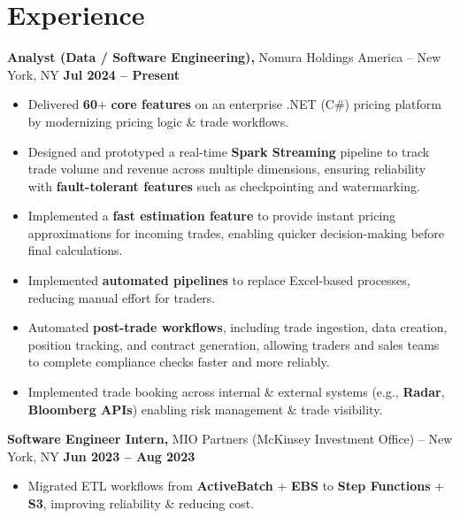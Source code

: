 \documentclass[letterpaper]{article}
\begin{document}
\section*{Experience}
\textbf{Analyst (Data / Software Engineering),} Nomura Holdings America -- New York, NY \hfill \textbf{Jul 2024 -- Present} \\
\vspace{2pt}
\begin{itemize}
  \item Delivered \textbf{60}+ \textbf{core features} on an enterprise .NET (C\#) pricing platform by modernizing pricing logic \& trade workflows.
  \item Designed and prototyped a real-time \textbf{Spark Streaming} pipeline to track trade volume and revenue across multiple dimensions, ensuring reliability with \textbf{fault-tolerant features} such as checkpointing and watermarking.
  \item Implemented a \textbf{fast estimation feature} to provide instant pricing approximations for incoming trades, enabling quicker decision-making before final calculations.
  \item Implemented \textbf{automated pipelines} to replace Excel-based processes, reducing manual effort for traders.
  \item Automated \textbf{post-trade workflows}, including trade ingestion, data creation, position tracking, and contract generation, allowing traders and sales teams to complete compliance checks faster and more reliably.
  \item Implemented trade booking across internal \& external systems (e.g., \textbf{Radar}, \textbf{Bloomberg APIs}) enabling risk management \& trade visibility.
\end{itemize}

\textbf{Software Engineer Intern,} MIO Partners (McKinsey Investment Office) -- New York, NY \hfill \textbf{Jun 2023 -- Aug 2023} \\
\vspace{2pt}
\begin{itemize}
  \item Migrated ETL workflows from \textbf{ActiveBatch} + \textbf{EBS} to \textbf{Step Functions} + \textbf{S3}, improving reliability \& reducing cost.
\end{itemize}
\end{document}
